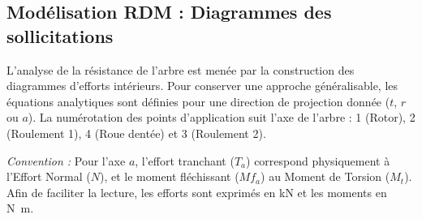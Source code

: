 \documentclass[11pt,a4paper]{article}
\begin{document}
\subsection{Modélisation RDM : Diagrammes des sollicitations}

L'analyse de la résistance de l'arbre est menée par la construction des diagrammes d'efforts intérieurs. Pour conserver une approche généralisable, les équations analytiques sont définies pour une direction de projection donnée ($t$, $r$ ou $a$). La numérotation des points d'application suit l'axe de l'arbre : 1 (Rotor), 2 (Roulement 1), 4 (Roue dentée) et 3 (Roulement 2).

\textit{Convention :} Pour l'axe $a$, l'effort tranchant ($T_a$) correspond physiquement à l'Effort Normal ($N$), et le moment fléchissant ($Mf_a$) au Moment de Torsion ($M_t$). Afin de faciliter la lecture, les efforts sont exprimés en \unit{\kilo\newton} et les moments en \unit{\newton\meter}.

\end{document}
